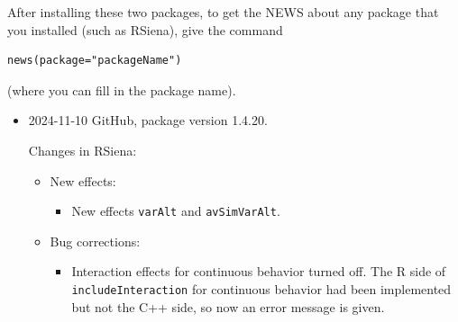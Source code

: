 \documentclass[a4paper,fleqn,11pt]{article}
\newcommand{\+}{\, + \,}
\newcommand{\rs}{{\sf RSiena}}
\begin{document}
After installing these two packages,
to get the NEWS about any package that you installed
(such  as \rs), give the command
\begin{verbatim}
news(package="packageName")
\end{verbatim}
(where you can fill in the package name).
\bigskip

\begin{small}
\begin{itemize} %

\item 2024-11-10 GitHub, package version 1.4.20.

Changes in RSiena:
\begin{itemize}
\item New effects:
   \begin{itemize}
	\item New effects \texttt{varAlt} and \texttt{avSimVarAlt}.
    \end{itemize}
\item Bug corrections:
   \begin{itemize}
	\item Interaction effects for continuous behavior turned off. The R side of
	\texttt{includeInteraction} for continuous behavior had been implemented but 
	not the C++ side, so now an error message is given.
    \end{itemize}
\end{itemize}


\end{itemize}
\end{small}
\end{document}

